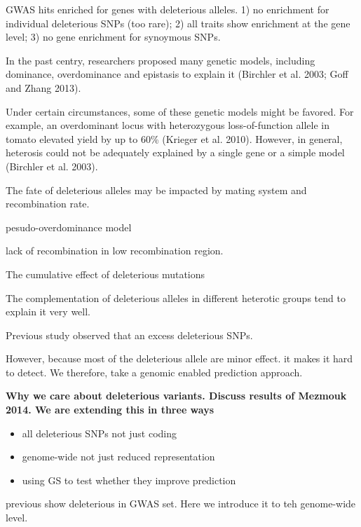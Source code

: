 \documentclass[10pt]{article}
\begin{document}
GWAS hits enriched for genes with deleterious alleles. 1) no enrichment for individual deleterious SNPs (too rare); 2) all traits show enrichment at the gene level; 3) no gene enrichment for synoymous SNPs.











In the past centry, researchers proposed many genetic models, including dominance, overdominance and epistasis to explain it (Birchler et al. 2003; Goff and Zhang 2013). 

Under certain circumstances, some of these genetic models might be favored. For example, an overdominant locus with heterozygous loss-of-function allele in tomato elevated yield by up to 60\% (Krieger et al. 2010). However, in general, heterosis could not be adequately explained by a single gene or a simple model (Birchler et al. 2003).


The fate of deleterious alleles may be impacted by mating system and recombination rate.   


pesudo-overdominance model

lack of recombination in low recombination region. 

The cumulative effect of deleterious mutations 


The complementation of deleterious alleles in different heterotic groups tend to explain it very well.

Previous study observed that an excess deleterious SNPs.

However, because most of the deleterious allele are minor effect. it makes it hard to detect. We therefore, take a genomic enabled prediction approach. 



\textbf{Why we care about deleterious variants. Discuss results of Mezmouk 2014. We are extending this in three ways}  
\begin{itemize}
  \item all deleterious SNPs not just coding
  \item genome-wide not just reduced representation
  \item using GS to test whether they improve prediction
\end{itemize}



previous show deleterious in GWAS set. Here we introduce it to teh genome-wide level.
\end{document}
